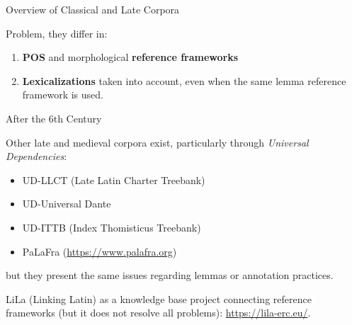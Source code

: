 \documentclass[aspectratio=169]{beamer}
\begin{document}
\begin{frame}{Overview of Classical and Late Corpora}

\begin{table}[h]
\centering
{}
\caption{Summary of information on the four available corpora. There are 137 works in the LASLA corpus, but some are unusual divisions, so we prefer to indicate 100+ here.}
\end{table}

\pause

\vspace{-.5em}

Problem, they differ in:
\begin{enumerate}
    \item \textbf{POS} and morphological \textbf{reference frameworks}
    \item \textbf{Lexicalizations} taken into account, even when the same lemma reference framework is used.
\end{enumerate}

\end{frame}

\begin{frame}{After the 6th Century}

Other late and medieval corpora exist, particularly through \textit{Universal Dependencies}: 

\begin{itemize}
    \item UD-LLCT (Late Latin Charter Treebank)
    \item UD-Universal Dante
    \item UD-ITTB (Index Thomisticus Treebank)
    \item PaLaFra (\url{https://www.palafra.org})
\end{itemize}

but they present the same issues regarding lemmas or annotation practices.

LiLa (Linking Latin) as a knowledge base project connecting reference frameworks (but it does not resolve all problems): \url{https://lila-erc.eu/}.
    
\end{frame}
\end{document}
